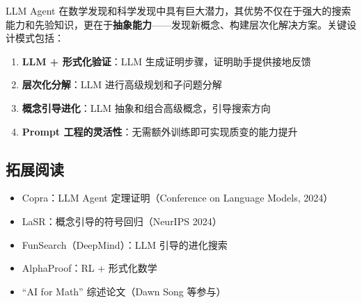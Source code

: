\documentclass[a4paper]{article}
\begin{document}
LLM Agent 在数学发现和科学发现中具有巨大潜力，其优势不仅在于强大的搜索能力和先验知识，更在于\textbf{抽象能力}——发现新概念、构建层次化解决方案。关键设计模式包括：

\begin{enumerate}
    \item \textbf{LLM + 形式化验证}：LLM 生成证明步骤，证明助手提供接地反馈
    \item \textbf{层次化分解}：LLM 进行高级规划和子问题分解
    \item \textbf{概念引导进化}：LLM 抽象和组合高级概念，引导搜索方向
    \item \textbf{Prompt 工程的灵活性}：无需额外训练即可实现质变的能力提升
\end{enumerate}

\subsection{拓展阅读}
\begin{itemize}
    \item Copra：LLM Agent 定理证明（Conference on Language Models, 2024）
    \item LaSR：概念引导的符号回归（NeurIPS 2024）
    \item FunSearch（DeepMind）：LLM 引导的进化搜索
    \item AlphaProof：RL + 形式化数学
    \item ``AI for Math'' 综述论文（Dawn Song 等参与）
\end{itemize}
\end{document}
